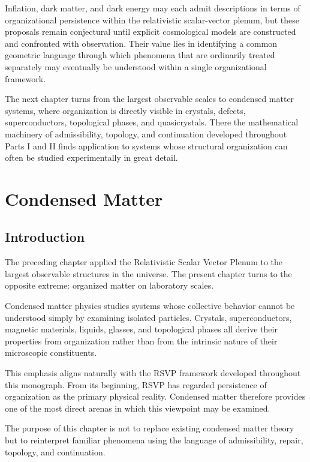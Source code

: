 \documentclass[11pt,oneside]{book}
\numberwithin{equation}{chapter}
\theoremstyle{definition}
\theoremstyle{plain}
\begin{document}
Inflation, dark matter, and dark energy may each admit descriptions in terms
of organizational persistence within the relativistic scalar-vector plenum,
but these proposals remain conjectural until explicit cosmological models
are constructed and confronted with observation. Their value lies in
identifying a common geometric language through which phenomena that are
ordinarily treated separately may eventually be understood within a single
organizational framework.

The next chapter turns from the largest observable scales to condensed
matter systems, where organization is directly visible in crystals,
defects, superconductors, topological phases, and quasicrystals. There the
mathematical machinery of admissibility, topology, and continuation
developed throughout Parts I and II finds application to systems whose
structural organization can often be studied experimentally in great
detail.

\chapter{Condensed Matter}

\section{Introduction}

The preceding chapter applied the Relativistic Scalar Vector Plenum to the
largest observable structures in the universe. The present chapter turns to
the opposite extreme: organized matter on laboratory scales.

Condensed matter physics studies systems whose collective behavior cannot be
understood simply by examining isolated particles. Crystals,
superconductors, magnetic materials, liquids, glasses, and topological
phases all derive their properties from organization rather than from the
intrinsic nature of their microscopic constituents.

This emphasis aligns naturally with the RSVP framework developed throughout
this monograph. From its beginning, RSVP has regarded persistence of
organization as the primary physical reality. Condensed matter therefore
provides one of the most direct arenas in which this viewpoint may be
examined.

The purpose of this chapter is not to replace existing condensed matter
theory but to reinterpret familiar phenomena using the language of
admissibility, repair, topology, and continuation.
\end{document}
